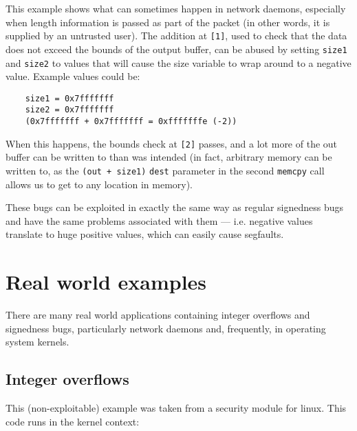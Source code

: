 \documentclass{iacrtrans}
\begin{document}
This example shows what can sometimes happen in network daemons, especially
when length information is passed as part of the packet (in other words, it
is supplied by an untrusted user).  The addition at \texttt{[1]}, used to check that
the data does not exceed the bounds of the output buffer, can be abused by
setting \texttt{size1} and \texttt{size2} to values that will cause the size variable to wrap
around to a negative value.  Example values could be:
\begin{verbatim}
    size1 = 0x7fffffff
    size2 = 0x7fffffff
    (0x7fffffff + 0x7fffffff = 0xfffffffe (-2))
\end{verbatim}
When this happens, the bounds check at \texttt{[2]} passes, and a lot more of the
out buffer can be written to than was intended (in fact, arbitrary memory
can be written to, as the \texttt{(out + size1)} \texttt{dest} parameter in the second \texttt{memcpy}
call allows us to get to any location in memory).

These bugs can be exploited in exactly the same way as regular signedness
bugs and have the same problems associated with them — i.e. negative values
translate to huge positive values, which can easily cause segfaults.



\section{Real world examples}

There are many real world applications containing integer overflows and
signedness bugs, particularly network daemons and, frequently, in operating
system kernels.

\subsection{Integer overflows}

This (non-exploitable) example was taken from a security module for linux.
This code runs in the kernel context:
\end{document}
